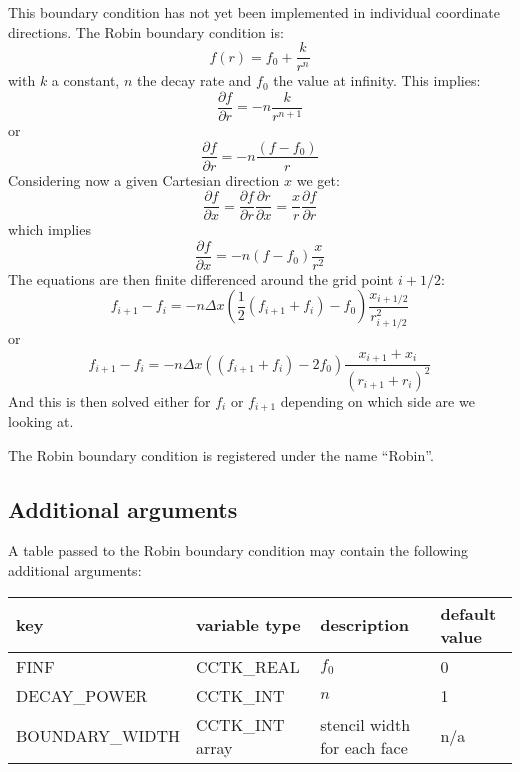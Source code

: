\documentclass{article}
\begin{document}
This boundary condition has not yet been implemented in 
individual coordinate directions.
The Robin boundary condition is:
\begin{equation}
f(r) = f_0 + \frac{k}{r^n}
\end{equation}
with $k$ a constant, $n$ the decay rate and $f_0$ the value at infinity. This implies:
\begin{equation}
\frac{\partial f}{\partial r} =  - n \frac{k}{r^{n+1}}
\end{equation}
or
\begin{equation}
\frac{\partial f}{\partial r} = - n \frac{(f-f_0)}{r}
\end{equation}
Considering now a given Cartesian direction $x$  we get:
\begin{equation}
\frac{\partial f}{\partial x} =
\frac{\partial f}{\partial r} 
\frac{\partial r}{\partial x} = \frac{x}{r}\frac{\partial f}{\partial r}
\end{equation}
which implies
\begin{equation}
\frac{\partial f}{\partial x} = - n (f-f_0)\frac{x}{r^2}
\end{equation}
The equations are then finite differenced around the grid point $i+1/2$:
\begin{equation}
f_{i+1} - f_i = - n \Delta x \left( \frac{1}{2}(f_{i+1}+f_i) - f_0\right) \frac{x_{i+1/2}}{r^2_{i+1/2}}
\end{equation}
or
\begin{equation}
f_{i+1}-f_i = -n \Delta x ( (f_{i+1}+f_i)-2 f_0)\frac{x_{i+1}+x_i}{(r_{i+1}+r_i)^2}
\end{equation}
And this is then solved either for $f_i$ or $f_{i+1}$ depending on which side are
we looking at.

The Robin boundary condition is registered under the name ``Robin''.


\subsection{Additional arguments}

A table passed to the Robin boundary condition may contain the
following additional arguments:\\[1mm]
\begin{tabular}{|l|l|l|l|}
\hline
\textbf{key} & \textbf{variable type} & \textbf{description} & \textbf{default value}\\
\hline
FINF & CCTK\_REAL & $f_0$ & 0\\
DECAY\_POWER & CCTK\_INT & $n$ & 1\\
BOUNDARY\_WIDTH & CCTK\_INT array & stencil width for each face & n/a\\
\hline
\end{tabular}
\end{document}
